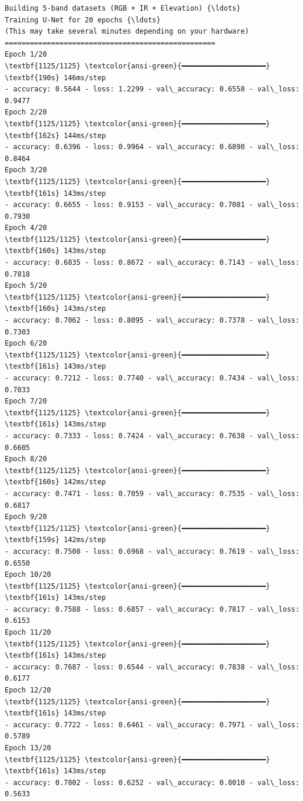 \documentclass[11pt]{article}
\begin{document}
    \begin{Verbatim}[commandchars=\\\{\}]
Building 5-band datasets (RGB + IR + Elevation) {\ldots}
Training U-Net for 20 epochs {\ldots}
(This may take several minutes depending on your hardware)
==================================================
Epoch 1/20
\textbf{1125/1125} \textcolor{ansi-green}{━━━━━━━━━━━━━━━━━━━━} \textbf{190s} 146ms/step
- accuracy: 0.5644 - loss: 1.2299 - val\_accuracy: 0.6558 - val\_loss: 0.9477
Epoch 2/20
\textbf{1125/1125} \textcolor{ansi-green}{━━━━━━━━━━━━━━━━━━━━} \textbf{162s} 144ms/step
- accuracy: 0.6396 - loss: 0.9964 - val\_accuracy: 0.6890 - val\_loss: 0.8464
Epoch 3/20
\textbf{1125/1125} \textcolor{ansi-green}{━━━━━━━━━━━━━━━━━━━━} \textbf{161s} 143ms/step
- accuracy: 0.6655 - loss: 0.9153 - val\_accuracy: 0.7081 - val\_loss: 0.7930
Epoch 4/20
\textbf{1125/1125} \textcolor{ansi-green}{━━━━━━━━━━━━━━━━━━━━} \textbf{160s} 143ms/step
- accuracy: 0.6835 - loss: 0.8672 - val\_accuracy: 0.7143 - val\_loss: 0.7818
Epoch 5/20
\textbf{1125/1125} \textcolor{ansi-green}{━━━━━━━━━━━━━━━━━━━━} \textbf{160s} 143ms/step
- accuracy: 0.7062 - loss: 0.8095 - val\_accuracy: 0.7378 - val\_loss: 0.7303
Epoch 6/20
\textbf{1125/1125} \textcolor{ansi-green}{━━━━━━━━━━━━━━━━━━━━} \textbf{161s} 143ms/step
- accuracy: 0.7212 - loss: 0.7740 - val\_accuracy: 0.7434 - val\_loss: 0.7033
Epoch 7/20
\textbf{1125/1125} \textcolor{ansi-green}{━━━━━━━━━━━━━━━━━━━━} \textbf{161s} 143ms/step
- accuracy: 0.7333 - loss: 0.7424 - val\_accuracy: 0.7638 - val\_loss: 0.6605
Epoch 8/20
\textbf{1125/1125} \textcolor{ansi-green}{━━━━━━━━━━━━━━━━━━━━} \textbf{160s} 142ms/step
- accuracy: 0.7471 - loss: 0.7059 - val\_accuracy: 0.7535 - val\_loss: 0.6817
Epoch 9/20
\textbf{1125/1125} \textcolor{ansi-green}{━━━━━━━━━━━━━━━━━━━━} \textbf{159s} 142ms/step
- accuracy: 0.7508 - loss: 0.6968 - val\_accuracy: 0.7619 - val\_loss: 0.6550
Epoch 10/20
\textbf{1125/1125} \textcolor{ansi-green}{━━━━━━━━━━━━━━━━━━━━} \textbf{161s} 143ms/step
- accuracy: 0.7588 - loss: 0.6857 - val\_accuracy: 0.7817 - val\_loss: 0.6153
Epoch 11/20
\textbf{1125/1125} \textcolor{ansi-green}{━━━━━━━━━━━━━━━━━━━━} \textbf{161s} 143ms/step
- accuracy: 0.7687 - loss: 0.6544 - val\_accuracy: 0.7838 - val\_loss: 0.6177
Epoch 12/20
\textbf{1125/1125} \textcolor{ansi-green}{━━━━━━━━━━━━━━━━━━━━} \textbf{161s} 143ms/step
- accuracy: 0.7722 - loss: 0.6461 - val\_accuracy: 0.7971 - val\_loss: 0.5789
Epoch 13/20
\textbf{1125/1125} \textcolor{ansi-green}{━━━━━━━━━━━━━━━━━━━━} \textbf{161s} 143ms/step
- accuracy: 0.7802 - loss: 0.6252 - val\_accuracy: 0.8010 - val\_loss: 0.5633

\end{Verbatim}
\end{document}
